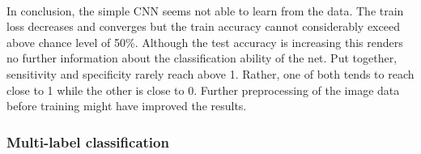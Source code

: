 \\
In conclusion, the simple CNN seems not able to learn from the data. The train loss decreases and converges but the train accuracy cannot considerably exceed above chance level of 50\%. Although the test accuracy is increasing this renders no further information about the classification ability of the net. Put together, sensitivity and specificity rarely reach above 1. Rather, one of both tends to reach close to 1 while the other is close to 0. Further preprocessing of the image data before training might have improved the results.



\subsubsection{Multi-label classification}


